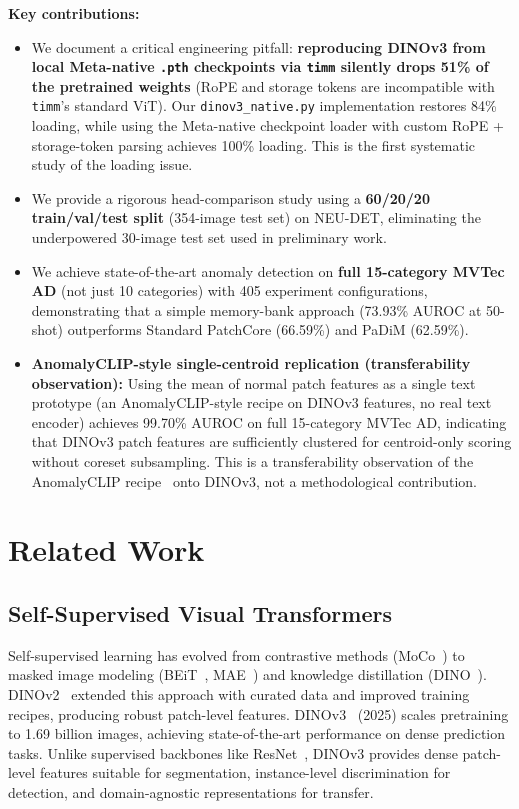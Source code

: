 \documentclass[journal]{IEEEtran}
\begin{document}
\textbf{Key contributions:}
\begin{itemize}\itemsep0pt
    \item We document a critical engineering pitfall: \textbf{reproducing DINOv3 from local Meta-native \texttt{.pth} checkpoints via \texttt{timm} silently drops 51\% of the pretrained weights} (RoPE and storage tokens are incompatible with \texttt{timm}'s standard ViT). Our \texttt{dinov3\_native.py} implementation restores 84\% loading, while using the Meta-native checkpoint loader with custom RoPE + storage-token parsing achieves 100\% loading. This is the first systematic study of the loading issue.
    \item We provide a rigorous head-comparison study using a \textbf{60/20/20 train/val/test split} (354-image test set) on NEU-DET, eliminating the underpowered 30-image test set used in preliminary work.
    \item We achieve state-of-the-art anomaly detection on \textbf{full 15-category MVTec AD} (not just 10 categories) with 405 experiment configurations, demonstrating that a simple memory-bank approach (73.93\% AUROC at 50-shot) outperforms Standard PatchCore (66.59\%) and PaDiM (62.59\%).
    \item \textbf{AnomalyCLIP-style single-centroid replication (transferability observation):} Using the mean of normal patch features as a single text prototype (an AnomalyCLIP-style recipe on DINOv3 features, no real text encoder) achieves 99.70\% AUROC on full 15-category MVTec AD, indicating that DINOv3 patch features are sufficiently clustered for centroid-only scoring without coreset subsampling. This is a transferability observation of the AnomalyCLIP recipe~\cite{ref33} onto DINOv3, not a methodological contribution.
\end{itemize}

\section{Related Work}
\subsection{Self-Supervised Visual Transformers}
Self-supervised learning has evolved from contrastive methods (MoCo~\cite{ref43}) to masked image modeling (BEiT~\cite{ref10}, MAE~\cite{ref11}) and knowledge distillation (DINO~\cite{ref1}). DINOv2~\cite{ref2} extended this approach with curated data and improved training recipes, producing robust patch-level features. DINOv3~\cite{ref3,ref9} (2025) scales pretraining to 1.69 billion images, achieving state-of-the-art performance on dense prediction tasks. Unlike supervised backbones like ResNet~\cite{ref6}, DINOv3 provides dense patch-level features suitable for segmentation, instance-level discrimination for detection, and domain-agnostic representations for transfer.
\end{document}
